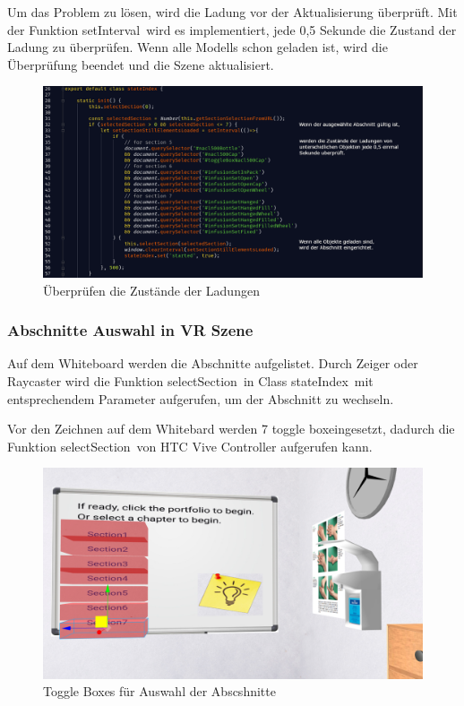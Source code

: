   Um das Problem zu lösen, wird die Ladung vor der Aktualisierung überprüft. Mit der Funktion \glqq setInterval\grqq\ wird es implementiert, jede 0,5 Sekunde die Zustand der Ladung zu überprüfen. Wenn alle Modells schon geladen ist, wird die Überprüfung beendet und die Szene aktualisiert.
  
\begin{figure}[ht]
\vspace*{0.3cm}
\centering
\includegraphics[width=\textwidth]{images/checkLadung.png}
\caption[Überprüfen die Zustände der Ladungen]{Überprüfen die Zustände der Ladungen}
\label{fig:checkLadung} 
\end{figure}
  
  \subsubsection{Abschnitte Auswahl in VR Szene}
  Auf dem Whiteboard werden die Abschnitte aufgelistet. Durch Zeiger oder Raycaster wird die Funktion \glqq selectSection\grqq\ in Class \glqq stateIndex\grqq\ mit entsprechendem Parameter aufgerufen, um der Abschnitt zu wechseln.
  
  Vor den Zeichnen auf dem Whitebard werden 7 \glqq toggle box\grqq eingesetzt, dadurch die Funktion \glqq selectSection\grqq\ von HTC Vive Controller aufgerufen kann.
  
\begin{figure}[ht]
\vspace*{0.3cm}
\centering
\includegraphics[width=\textwidth]{images/toggleBoxAbschnitte.png}
\caption[Toggle Boxes]{Toggle Boxes für Auswahl der Abscshnitte}
\label{fig:toggleBoxAbschnitte} 
\end{figure}
  
